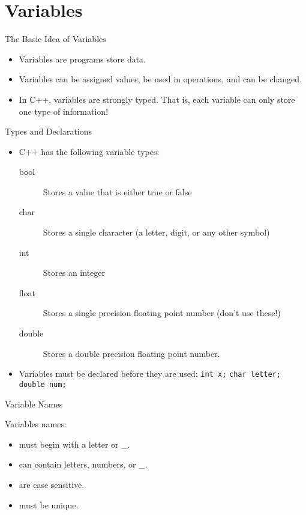 \documentclass{beamer}
\begin{document}
\section{Variables}
\begin{frame}{The Basic Idea of Variables}
    \begin{itemize}[<+->]
        \item Variables are programs store data.
        \item Variables can be assigned values, be used in operations,
            and can be changed.
        \item In C++, variables are strongly typed.  That is, each
            variable can only store one type of information!
    \end{itemize}
\end{frame}

\begin{frame}{Types and Declarations}
    \begin{itemize}[<+->]
        \item C++ has the following variable types:
            \begin{description}
                \item[bool] Stores a value that is either true or
                    false
                \item[char] Stores a single character (a letter,
                    digit, or any other symbol)
                \item[int] Stores an integer
                \item[float] Stores a single precision floating point
                    number (don't use these!)
                \item[double] Stores a double precision floating point 
                    number.
            \end{description}
        \item Variables must be declared before they are used:
            \newline\texttt{int x;}
            \newline\texttt{char letter;}
            \newline\texttt{double num;}
    \end{itemize}
\end{frame}

\begin{frame}{Variable Names}

Variables names:
\begin{itemize}[<+->]
    \item must begin with a letter or \_.
    \item can contain letters, numbers, or \_.
    \item are case sensitive.
    \item must be unique.
\end{itemize}
\end{frame}
\end{document}
